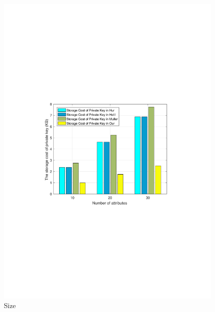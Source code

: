 \documentclass[smallextended]{svjour3}       %
\begin{document}
\begin{figure}[htbp]
	\centering
	\includegraphics[width=\textwidth]{PrivateKey_Size.pdf}
	\caption{Size}
	\label{fig.privateKeySize}
\end{figure}


















\end{document}
